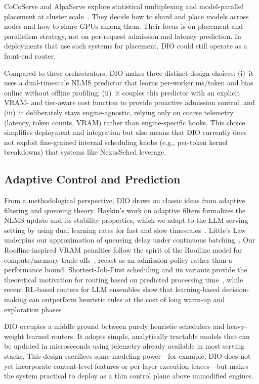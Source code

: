 \documentclass[10pt,twocolumn,letterpaper]{article}
\begin{document}
CoCoServe and AlpaServe explore statistical multiplexing and model-parallel placement at cluster scale~\cite{CocoServe,alpaserve}.
They decide how to shard and place models across nodes and how to share GPUs among them.
Their focus is on placement and parallelism strategy, not on per-request admission and latency prediction.
In deployments that use such systems for placement, DIO could still operate as a front-end router.

Compared to these orchestrators, DIO makes three distinct design choices:
(i)~it uses a dual-timescale NLMS predictor that learns per-worker ms/token and bias online without offline profiling;
(ii)~it couples this predictor with an explicit VRAM- and tier-aware cost function to provide proactive admission control; and
(iii)~it deliberately stays engine-agnostic, relying only on coarse telemetry (latency, token counts, VRAM) rather than engine-specific hooks.
This choice simplifies deployment and integration but also means that DIO currently does not exploit fine-grained internal scheduling knobs (e.g., per-token kernel breakdowns) that systems like NexusSched leverage.

\subsection{Adaptive Control and Prediction}

From a methodological perspective, DIO draws on classic ideas from adaptive filtering and queueing theory.
Haykin's work on adaptive filters formalizes the NLMS update and its stability properties, which we adapt to the LLM serving setting by using dual learning rates for fast and slow timescales~\cite{haykin2002adaptive}.
Little's Law underpins our approximation of queueing delay under continuous batching~\cite{littleslaw}.
Our Roofline-inspired VRAM penalties follow the spirit of the Roofline model for compute/memory trade-offs~\cite{williams2009roofline}, recast as an admission policy rather than a performance bound.
Shortest-Job-First scheduling and its variants provide the theoretical motivation for routing based on predicted processing time~\cite{sjf}, while recent RL-based routers for LLM ensembles show that learning-based decision-making can outperform heuristic rules at the cost of long warm-up and exploration phases~\cite{rlrouter}.

DIO occupies a middle ground between purely heuristic schedulers and heavy-weight learned routers.
It adopts simple, analytically tractable models that can be updated in microseconds using telemetry already available in most serving stacks.
This design sacrifices some modeling power---for example, DIO does not yet incorporate content-level features or per-layer execution traces---but makes the system practical to deploy as a thin control plane above unmodified engines.
\end{document}
